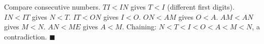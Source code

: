 Compare consecutive numbers. $TI<IN$ gives $T<I$ (different first digits). $IN<IT$ gives $N<T$. $IT<ON$ gives $I<O$. $ON<AM$ gives $O<A$. $AM<AN$ gives $M<N$. $AN<ME$ gives $A<M$. Chaining: $N<T<I<O<A<M<N$, a contradiction. $\blacksquare$
